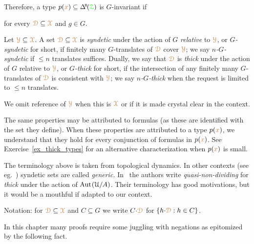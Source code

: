
Therefore, a type $p({\mr x})\subseteq\BDelta(\grZ)$ is $G$-invariant if

\hfill for every ${\color{brown}\EuScript D}\subseteq{\color{brown}\EuScript X}$ and $g\in G$.


Let ${\color{brown}\EuScript Y}\subseteq{\color{brown}\EuScript X}$.
A set ${\color{brown}\EuScript D}\subseteq{\color{brown}\EuScript X}$ is \emph{syndetic\/} under the action of $G$ \emph{relative\/} to ${\color{brown}\EuScript Y}$, or \emph{$G$-syndetic\/} for short, if finitely many $G$-translates of ${\color{brown}\EuScript D}$ cover ${\color{brown}\EuScript Y}$; we say \emph{$n$-$G$-syndetic\/} if $\le n$ translates suffices.
Dually, we say that ${\color{brown}\EuScript D}$ is \emph{thick\/} under the action of $G$ relative to ${\color{brown}\EuScript Y}$, or \emph{$G$-thick\/} for short, if the intersection of any finitely many $G$-translates of ${\color{brown}\EuScript D}$ is consistent with ${\color{brown}\EuScript Y}$; we say \emph{$n$-$G$-thick\/} when the request is limited to $\le n$ translates.

We omit reference of ${\color{brown}\EuScript Y}$ when this is ${\color{brown}\EuScript X}$ or if it is made crystal clear in the context.

The same properties may be attributed to formulas (as these are identified with the set they define).
When these properties are attributed to a type $p({\color{brown} x})$, we understand that they hold for every conjunction of formulas in $p({\color{brown} x})$.
See Exercise~\ref{ex_thick_types} for an alternative characterization when $p({\color{brown} x})$ is small.

\noindent\llap{\textcolor{red}{\Large\warning}\kern1.5ex}\ignorespaces
The terminology above is taken from topological dynamics.
In other contexts (see eg.~\cite{Newelski09}) syndetic sets are called \textit{generic.}
In~\cite{CK} the authors write \textit{quasi-non-dividing\/} for \textit{thick\/} under the action of ${\rm Aut\kern.15ex}(\EuScript U/A)$.
Their terminology has good motivations, but it would be a mouthful if adapted to our context.

Notation: for ${\color{brown}\EuScript D}\subseteq{\color{brown}\EuScript X}$ and $C\subseteq G$ we write \emph{$C{\cdot}{\color{brown}\EuScript D}$\/} for $\{h{\cdot}{\color{brown}\EuScript D}: h\in C\}$.

In this chapter many proofs require some juggling with negations as epitomized by the following fact.

